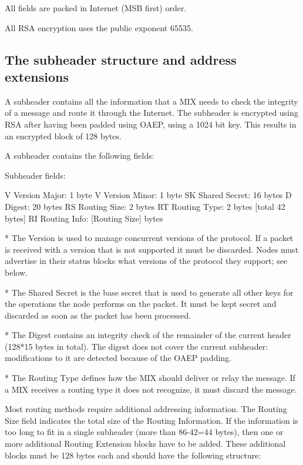 All fields are packed in Internet (MSB first) order.

All RSA encryption uses the public exponent 65535.

\subsection{The subheader structure and address extensions}

A subheader contains all the information that a MIX needs to check the
integrity of a message and route it through the Internet. The subheader
is encrypted using RSA after having been padded using OAEP, using a 1024
bit key. This results in an encrypted block of 128 bytes.

A subheader contains the following fields:

Subheader fields:

V   Version Major:   1 byte
V   Version Minor:   1 byte
SK  Shared Secret:   16 bytes
D   Digest:          20 bytes
RS  Routing Size:    2 bytes 
RT  Routing Type:    2 bytes [total 42 bytes]
RI  Routing Info:    [Routing Size] bytes

* The Version is used to manage concurrent versions of the
protocol. If a packet is received with a version that is not supported
it must be discarded. Nodes must advertise in their status blocks what
versions of the protocol they support; see below.

* The Shared Secret is the base secret that is used to generate all
other keys for the operations the node performs on the packet. It must be
kept secret and discarded as soon as the packet has been processed. 

* The Digest contains an integrity check of the remainder of the current
header (128*15 bytes in total). The digest does not cover the current
subheader: modifications to it are detected because of the OAEP padding.

* The Routing Type defines how the MIX should deliver or relay the
  message. If a MIX receives a routing type it does not recognize,
  it must discard the message.

  Most routing methods require additional addressing information.
  The Routing Size field indicates the total size of the Routing
  Information. If the information is too long to fit in a single
  subheader (more than 86-42=44 bytes), then one or more additional
  Routing Extension blocks have to be added. These additional blocks
  must be 128 bytes each and should have the following structure:
 
